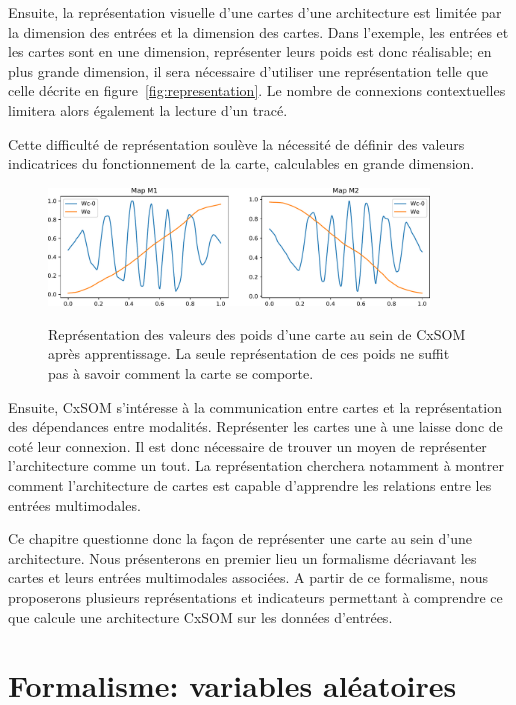 Ensuite, la représentation visuelle d'une cartes d'une architecture est limitée par la dimension des entrées et la dimension des cartes. Dans l'exemple, les entrées et les cartes sont en une dimension, représenter leurs poids est donc réalisable; en plus grande dimension, il sera nécessaire d'utiliser une représentation telle que celle décrite en figure~\ref{fig:representation}. Le nombre de connexions contextuelles limitera alors également la lecture d'un tracé.

Cette difficulté de représentation soulève la nécessité de définir des valeurs indicatrices du fonctionnement de la carte, calculables en grande dimension.

\begin{figure}
\centering
\includegraphics[width=0.9\textwidth]{weights_cercle1.pdf}
\label{fig:weights}
\caption{Représentation des valeurs des poids d'une carte au sein de CxSOM après apprentissage. La seule représentation de ces poids ne suffit pas à savoir comment la carte se comporte.}
\end{figure}

Ensuite, CxSOM s'intéresse à la communication entre cartes et la représentation des dépendances entre modalités. Représenter les cartes une à une laisse donc de coté leur connexion. Il est donc nécessaire de trouver un moyen de représenter l'architecture comme un tout. La représentation cherchera notamment à montrer comment l'architecture de cartes est capable d'apprendre les relations entre les entrées multimodales.

Ce chapitre questionne donc la façon de représenter une carte au sein d'une architecture. Nous présenterons en premier lieu un formalisme décriavant les cartes et leurs entrées multimodales associées. A partir de ce formalisme, nous proposerons plusieurs représentations et indicateurs permettant à comprendre ce que calcule une architecture CxSOM sur les données d'entrées.

\section{Formalisme: variables aléatoires}

